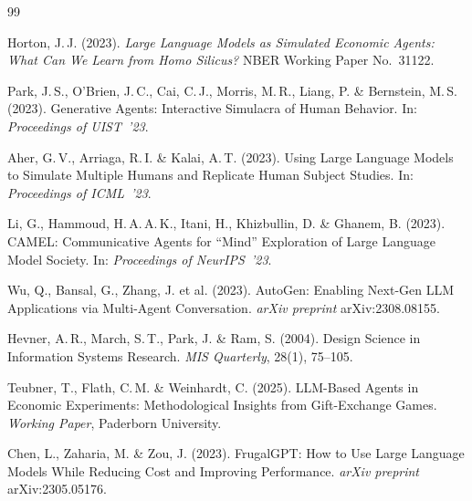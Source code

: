 \documentclass[12pt, a4paper]{article}
\begin{document}
\begin{thebibliography}{99}

Horton, J.\,J. (2023).
\textit{Large Language Models as Simulated Economic Agents: What Can We Learn from Homo Silicus?}
NBER Working Paper No.\ 31122.

Park, J.\,S., O'Brien, J.\,C., Cai, C.\,J., Morris, M.\,R., Liang, P. \& Bernstein, M.\,S. (2023).
Generative Agents: Interactive Simulacra of Human Behavior.
In: \textit{Proceedings of UIST~'23}.

Aher, G.\,V., Arriaga, R.\,I. \& Kalai, A.\,T. (2023).
Using Large Language Models to Simulate Multiple Humans and Replicate Human Subject Studies.
In: \textit{Proceedings of ICML~'23}.

Li, G., Hammoud, H.\,A.\,A.\,K., Itani, H., Khizbullin, D. \& Ghanem, B. (2023).
CAMEL: Communicative Agents for ``Mind'' Exploration of Large Language Model Society.
In: \textit{Proceedings of NeurIPS~'23}.

Wu, Q., Bansal, G., Zhang, J. et al. (2023).
AutoGen: Enabling Next-Gen LLM Applications via Multi-Agent Conversation.
\textit{arXiv preprint} arXiv:2308.08155.

Hevner, A.\,R., March, S.\,T., Park, J. \& Ram, S. (2004).
Design Science in Information Systems Research.
\textit{MIS Quarterly}, 28(1), 75--105.

Teubner, T., Flath, C.\,M. \& Weinhardt, C. (2025).
LLM-Based Agents in Economic Experiments: Methodological Insights from Gift-Exchange Games.
\textit{Working Paper}, Paderborn University.

Chen, L., Zaharia, M. \& Zou, J. (2023).
FrugalGPT: How to Use Large Language Models While Reducing Cost and Improving Performance.
\textit{arXiv preprint} arXiv:2305.05176.

\end{thebibliography}
\end{document}
